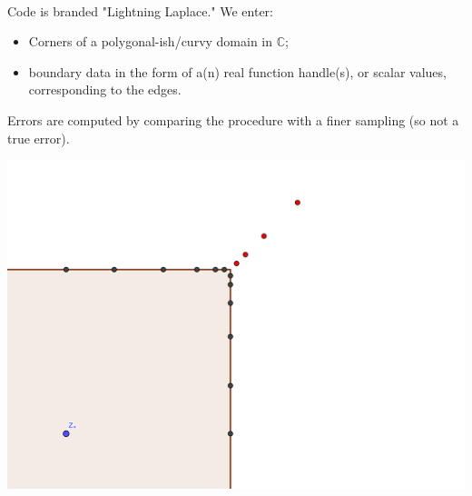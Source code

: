 \documentclass{seminar}
\begin{document}
\begin{slide} %
{} \small \\

Code is branded "Lightning Laplace." We enter:
\begin{itemize}
	\item Corners of a polygonal-ish/curvy domain in $\mathds{C}$;
	\item boundary data in the form of a(n) real function handle(s), or scalar values, corresponding to the edges.
\end{itemize}
Errors are computed by comparing the procedure with a finer sampling (so not a true error).\\
\begin{center}
\includegraphics[scale=4]{./PNG/corner_nodes_illust}
\end{center}
\end{slide} %
\end{document}
